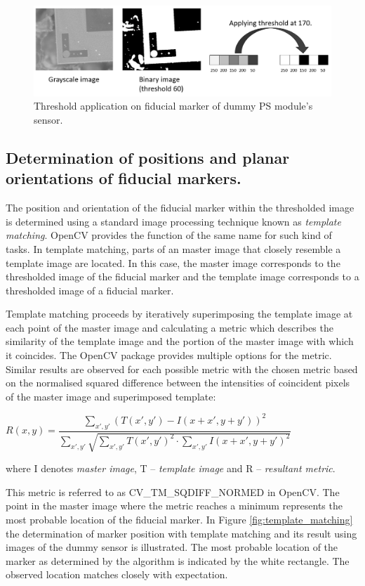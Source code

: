 \begin{figure}[ht]\centering
\includegraphics[width=0.9\linewidth]{Data/Control_Software/Threshold.png}
\caption{Threshold application on fiducial marker of dummy PS module's sensor.}
\label{fig:threshold}
\end{figure}

\subsection{Determination of positions and planar orientations of fiducial markers.}
The position and orientation of the fiducial marker within the thresholded image is determined using a standard image processing technique known as \emph{template matching}. OpenCV provides the function of the same name for such kind of tasks. In template matching, parts of an master image that closely resemble a template image are located. In this case, the master image corresponds to the thresholded image of the fiducial marker and the template image corresponds to a thresholded image of a fiducial marker.

Template matching proceeds by iteratively superimposing the template image at each point of the master image and calculating a metric which describes the similarity of the template image and the portion of the master image with which it coincides. The OpenCV package provides multiple options for the metric. Similar results are observed for each possible metric with the chosen metric based on the normalised squared difference between the intensities of coincident pixels of the master image and superimposed template:


\begin{center}
$R(x,y)=\dfrac{\sum_{x',y'}^{}(T(x',y')-I(x+x',y+y'))^{2}}{\sum_{x',y'}^{}\sqrt{\sum_{x',y'}^{}T(x',y')^{2}\cdot\sum_{x',y'}^{}I(x+x',y+y')^{2}}}$
\end{center}
where I denotes \emph{master image}, T -- \emph{template image} and R -- \emph{resultant metric}.

This metric is referred to as CV\_TM\_SQDIFF\_NORMED in OpenCV. The point in the master image where the metric reaches a minimum represents the most probable location of the fiducial marker. In Figure \ref{fig:template_matching} the determination of marker position with template matching and its result using images of the dummy sensor is illustrated. The most probable location of the marker as determined by the algorithm is indicated by the white rectangle. The observed location matches closely with expectation.

